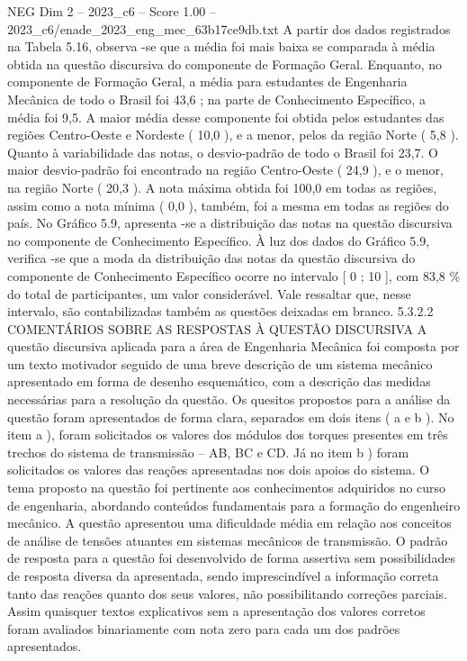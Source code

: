 \begin{textsample}{NEG Dim 2 – 2023\_c6 – Score 1.00 – 2023\_c6/enade\_2023\_eng\_mec\_63b17ce9db.txt}
A partir dos dados registrados na Tabela 5.16, observa -se que a média foi mais baixa se comparada à média obtida na questão discursiva do componente de Formação Geral.
Enquanto, no componente de Formação Geral, a média para estudantes de Engenharia Mecânica de todo o Brasil foi 43,6 ; na parte de Conhecimento Específico, a média foi 9,5.
A maior média desse componente foi obtida pelos estudantes das regiões Centro-Oeste e Nordeste ( 10,0 ), e a menor, pelos da região Norte ( 5,8 ).
Quanto à variabilidade das notas, o desvio-padrão de todo o Brasil foi 23,7.
O maior desvio-padrão foi encontrado na região Centro-Oeste ( 24,9 ), e o menor, na região Norte ( 20,3 ).
A nota máxima obtida foi 100,0 em todas as regiões, assim como a nota mínima ( 0,0 ), também, foi a mesma em todas as regiões do país.
No Gráfico 5.9, apresenta -se a distribuição das notas na questão discursiva no componente de Conhecimento Específico.
À luz dos dados do Gráfico 5.9, verifica -se que a moda da distribuição das notas da questão discursiva do componente de Conhecimento Específico ocorre no intervalo [ 0 ; 10 ], com 83,8 \% do total de participantes, um valor considerável.
Vale ressaltar que, nesse intervalo, são contabilizadas também as questões deixadas em branco. 5.3.2.2 COMENTÁRIOS SOBRE AS RESPOSTAS À QUESTÃO DISCURSIVA A questão discursiva aplicada para a área de Engenharia Mecânica foi composta por um texto motivador seguido de uma breve descrição de um sistema mecânico apresentado em forma de desenho esquemático, com a descrição das medidas necessárias para a resolução da questão.
Os quesitos propostos para a análise da questão foram apresentados de forma clara, separados em dois itens ( a e b ).
No item a ), foram solicitados os valores dos módulos dos torques presentes em três trechos do sistema de transmissão – AB, BC e CD.
Já no item b ) foram solicitados os valores das reações apresentadas nos dois apoios do sistema.
O tema proposto na questão foi pertinente aos conhecimentos adquiridos no curso de engenharia, abordando conteúdos fundamentais para a formação do engenheiro mecânico.
A questão apresentou uma dificuldade média em relação aos conceitos de análise de tensões atuantes em sistemas mecânicos de transmissão.
O padrão de resposta para a questão foi desenvolvido de forma assertiva sem possibilidades de resposta diversa da apresentada, sendo imprescindível a informação correta tanto das reações quanto dos seus valores, não possibilitando correções parciais.
Assim quaisquer textos explicativos sem a apresentação dos valores corretos foram avaliados binariamente com nota zero para cada um dos padrões apresentados.

\end{textsample}
